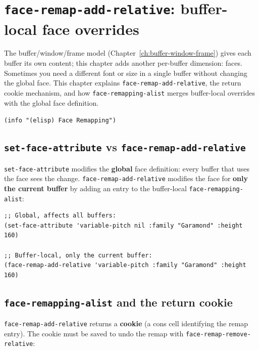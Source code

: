 \chapter{\texttt{face-remap-add-relative}: buffer-local face overrides}
\label{ch:face-remap}
\minitoc\label{face-remap-add-relative-buffer-local-face-overrides}

The buffer/window/frame model (Chapter~\ref{ch:buffer-window-frame})
gives each buffer its own content; this chapter adds another
per-buffer dimension: faces.  Sometimes you need a different font
or size in a single buffer without changing the global face.  This chapter explains
\texttt{face-remap-add-relative}, the return cookie mechanism, and
how \texttt{face-remapping-alist} merges buffer-local overrides with
the global face definition.

\texttt{(info "(elisp) Face Remapping")}

\section{\texttt{set-face-attribute} vs \texttt{face-remap-add-relative}}\label{set-face-attribute-vs-face-remap-add-relative}

\texttt{set-face-attribute} modifies the \textbf{global} face definition: every buffer that uses the face sees the change. \texttt{face-remap-add-relative} modifies the face for \textbf{only the current buffer} by adding an entry to the buffer-local \texttt{face-remapping-alist}:

\begin{verbatim}
;; Global, affects all buffers:
(set-face-attribute 'variable-pitch nil :family "Garamond" :height 160)

;; Buffer-local, only the current buffer:
(face-remap-add-relative 'variable-pitch :family "Garamond" :height 160)
\end{verbatim}

\section{\texttt{face-remapping-alist} and the return cookie}\label{face-remapping-alist-and-the-return-cookie}

\texttt{face-remap-add-relative} returns a \textbf{cookie} (a cons cell identifying the remap entry). The cookie must be saved to undo the remap with \texttt{face-remap-remove-relative}:

